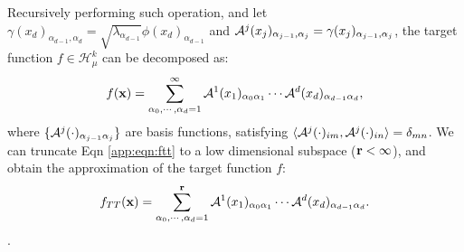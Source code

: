 Recursively performing such operation, and let $\gamma(x_d)_{\alpha_{d-1},\alpha_d} = \sqrt{\lambda_{\alpha_{d-1}}}\phi(x_d)_{\alpha_{d-1}}$ and ${\mathcal{A}}^j(x_j)_{\alpha_{j-1}, \alpha_j} =\gamma(x_j)_{\alpha_{j-1}, \alpha_j}$, the target function $f \in \mathcal{H}^k_\mu$ can be decomposed as:
%
\begin{eqnarray}
f(\V{x}) = \sum_{\alpha_0,\cdots,\alpha_d=1}^\infty
%
\T{A}^1(x_1)_{\alpha_0\alpha_1}
%
\cdots
%
\T{A}^d(x_d)_{\alpha_{d-1}\alpha_d},
\label{app:eqn:ftt}
\end{eqnarray}
%
where $\{{\mathcal{A}}^j(\cdot)_{\alpha_{j-1}\alpha_j} \}$ are basis functions,  
%
satisfying $\langle {\mathcal{A}}^j(\cdot)_{im}, {\mathcal{A}}^j (\cdot)_{in} \rangle =\delta_{mn}$.
%
We can truncate Eqn \ref{app:eqn:ftt} to a low dimensional subspace (${\mathbf{r}}<\infty$), and obtain the  approximation of the target function $f$:
%
\begin{eqnarray}
f_{TT}(\mathbf{x}) = \sum_{\alpha_0,\cdots,\alpha_d=1}^\mathbf{r}
%
\T{A}^1(x_1)_{\alpha_0\alpha_1}
%
\cdots
%
\T{A}^d(x_d)_{\alpha_{d-1}\alpha_d}.
\label{app:eqn:ftt}
\end{eqnarray}.

